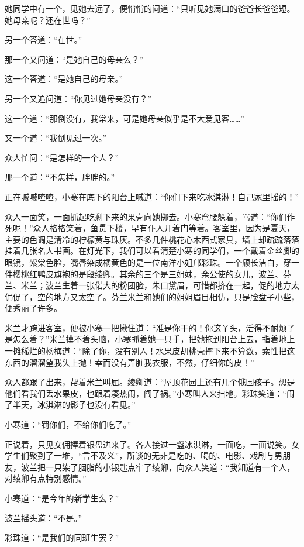 \par 她同学中有一个，见她去远了，便悄悄的问道：“只听见她满口的爸爸长爸爸短。她母亲呢？还在世吗？”
\par 另一个答道：“在世。”
\par 那一个又问道：“是她自己的母亲么？”
\par 这一个答道：“是她自己的母亲。”
\par 另一个又追问道：“你见过她母亲没有？”
\par 这一个道：“那倒没有，我常来，可是她母亲似乎是不大爱见客……”
\par 又一个道：“我倒见过一次。”
\par 众人忙问：“是怎样的一个人？”
\par 那一个道：“不怎样，胖胖的。”
\par 正在嘁嘁喳喳，小寒在底下的阳台上喊道：“你们下来吃冰淇淋！自己家里摇的！”
\par 众人一面笑，一面抓起吃剩下来的果壳向她掷去。小寒弯腰躲着，骂道：“你们作死呢！”众人格格笑着，鱼贯下楼，早有仆人开着门等着。客室里，因为是夏天，主要的色调是清冷的柠檬黄与珠灰。不多几件桃花心木西式家具，墙上却疏疏落落挂着几张名人书画。在灯光下，我们可以看清楚小寒的同学们，一个戴着金丝脚的眼镜，紫棠色脸，嘴唇染成橘黄色的是一位南洋小姐邝彩珠。一个颀长洁白，穿一件樱桃红鸭皮旗袍的是段绫卿。其余的三个是三姐妹，余公使的女儿，波兰、芬兰、米兰；波兰生着一张偌大的粉团脸，朱口黛眉，可惜都挤在一起，促的地方太侷促了，空的地方又太空了。芬兰米兰和她们的姐姐眉目相仿，只是脸盘子小些，便秀丽了许多。
\par 米兰才跨进客室，便被小寒一把揪住道：“准是你干的！你这丫头，活得不耐烦了是怎么着？”米兰摸不着头脑，小寒抓着她一只手，把她拖到阳台上去，指着地上一摊稀烂的杨梅道：“除了你，没有别人！水果皮胡桃壳摔下来不算数，索性把这东西的溜溜望我头上抛！幸而没有弄脏我衣服，不然，仔细你的皮！”
\par 众人都跟了出来，帮着米兰叫屈。绫卿道：“屋顶花园上还有几个俄国孩子。想是他们看我们丢水果皮，也跟着凑热闹，闯了祸。”小寒叫人来扫地。彩珠笑道：“闹了半天，冰淇淋的影子也没有看见。”
\par 小寒道：“罚你们，不给你们吃了。”
\par 正说着，只见女佣捧着银盘进来了。各人接过一盏冰淇淋，一面吃，一面说笑。女学生们聚到了一堆，“言不及义”，所谈的无非是吃的、喝的、电影、戏剧与男朋友，波兰把一只染了胭脂的小银匙点牢了绫卿，向众人笑道：“我知道有一个人，对绫卿有点特别感情。”
\par 小寒道：“是今年的新学生么？”
\par 波兰摇头道：“不是。”
\par 彩珠道：“是我们的同班生罢？”
